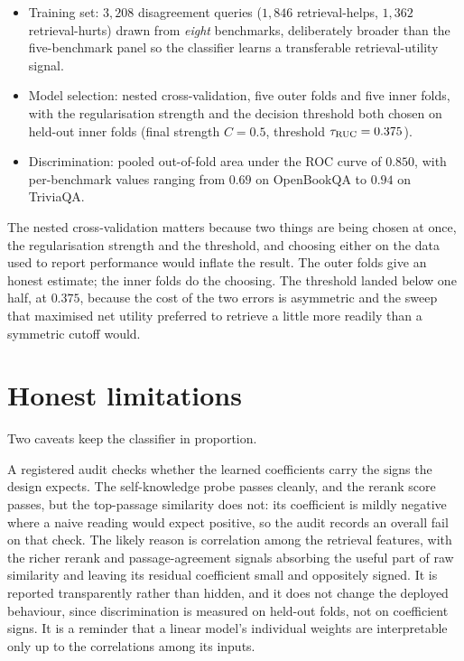 \begin{bythenumbers}
\begin{itemize}[leftmargin=1.3em, itemsep=1pt]
  \item Training set: $3{,}208$ disagreement queries ($1{,}846$ retrieval-helps,
  $1{,}362$ retrieval-hurts) drawn from \emph{eight} benchmarks, deliberately broader
  than the five-benchmark \caem{} panel so the classifier learns a transferable
  retrieval-utility signal.
  \item Model selection: nested cross-validation, five outer folds and five inner
  folds, with the regularisation strength and the decision threshold both chosen on
  held-out inner folds (final strength $C = 0.5$, threshold $\tau_{\text{RUC}} = 0.375$).
  \item Discrimination: pooled out-of-fold area under the ROC curve of $0.850$, with
  per-benchmark values ranging from $0.69$ on OpenBookQA to $0.94$ on TriviaQA.
\end{itemize}
\end{bythenumbers}

The nested cross-validation matters because two things are being chosen at once, the
regularisation strength and the threshold, and choosing either on the data used to
report performance would inflate the result. The outer folds give an honest estimate;
the inner folds do the choosing. The threshold landed below one half, at $0.375$,
because the cost of the two errors is asymmetric and the sweep that maximised net
utility preferred to retrieve a little more readily than a symmetric cutoff would.

\section{Honest limitations}
\label{sec:ruc-threats}

Two caveats keep the classifier in proportion.

\begin{pitfall}
A registered audit checks whether the learned coefficients carry the signs the design
expects. The self-knowledge probe passes cleanly, and the rerank score passes, but the
top-passage similarity does not: its coefficient is mildly negative where a naive reading
would expect positive, so the audit records an overall fail on that check. The likely
reason is correlation among the retrieval features, with the richer rerank and
passage-agreement signals absorbing the useful part of raw similarity and leaving its
residual coefficient small and oppositely signed. It is reported transparently rather
than hidden, and it does not change the deployed behaviour, since discrimination is
measured on held-out folds, not on coefficient signs. It is a reminder that a linear
model's individual weights are interpretable only up to the correlations among its
inputs.
\end{pitfall}


